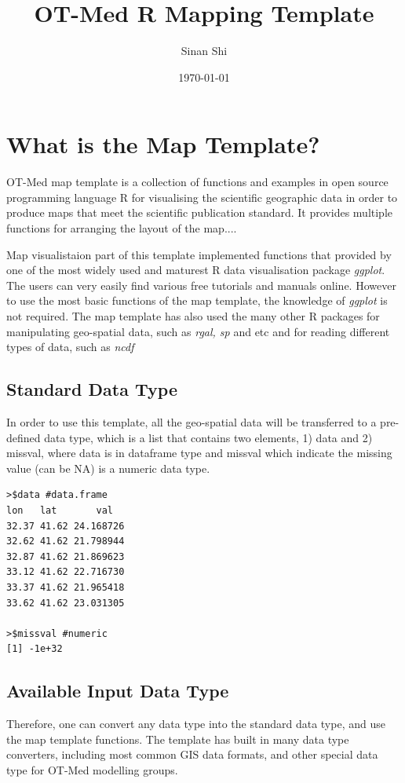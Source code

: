\documentclass[a4paper,10pt]{article}
\title{OT-Med R Mapping Template}
\author{Sinan Shi}
\date{\today}
\begin{document}
\maketitle
\tableofcontents

\listoffigures
\newpage

\section{What is the Map Template?}
OT-Med map template is a collection of functions and examples in open source programming language R for visualising the scientific geographic data in order to produce maps that meet the scientific publication standard. It provides multiple functions for arranging the layout of the map....

Map visualistaion part of this template implemented functions that provided by one of the most widely used and maturest R data visualisation package \textit{ggplot}. The users can very easily find various free tutorials and manuals online. However to use the most basic functions of the map template, the knowledge of \textit{ggplot} is not required. The map template has also used the many other R packages for manipulating geo-spatial data, such as \textit{rgal, sp} and etc and for reading different types of data, such as \textit{ncdf}

\subsection{Standard Data Type}
In order to use this template, all the geo-spatial data will be transferred to a pre-defined data type, which is a list that contains two elements, 1) data and 2) missval, where data is in dataframe type and missval which indicate the missing value (can be NA) is a numeric data type. 
\begin{lstlisting}
>$data #data.frame
lon	  lat		val
32.37 41.62 24.168726
32.62 41.62 21.798944
32.87 41.62 21.869623
33.12 41.62 22.716730
33.37 41.62 21.965418
33.62 41.62 23.031305

>$missval #numeric
[1] -1e+32
\end{lstlisting}

\subsection{Available Input Data Type}  
Therefore, one can convert any data type into the standard data type, and use the map template functions. The template has built in many data type converters, including most common GIS data formats, and other special data type for OT-Med modelling groups.
\end{document}

